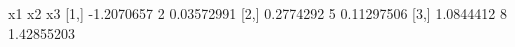\begin{Schunk}
\begin{Soutput}
             x1 x2         x3
[1,] -1.2070657  2 0.03572991
[2,]  0.2774292  5 0.11297506
[3,]  1.0844412  8 1.42855203
\end{Soutput}
\end{Schunk}
